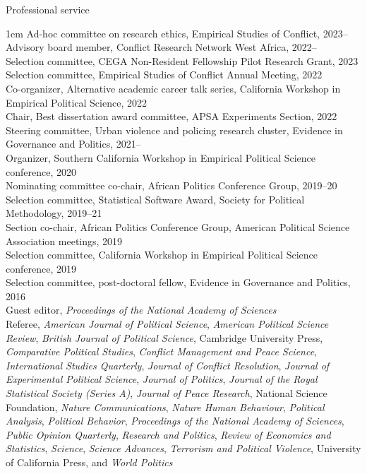\documentclass[10.9pt]{article}
\makeatletter
\newcommand\donotbreakhere{\par\nobreak\@afterheading\vspace{1em}}
\newenvironment{indnt}{\begin{adjustwidth}{1em}{}}{\end{adjustwidth}}
\makeatother
\begin{document}
{\large Professional service} \donotbreakhere
\begin{indnt}
Ad-hoc committee on research ethics, Empirical Studies of Conflict, 2023--\\[0.75em]
Advisory board member, Conflict Research Network West Africa, 2022--\\[0.75em]
Selection committee, CEGA Non-Resident Fellowship Pilot Research Grant, 2023\\[0.75em]
Selection committee, Empirical Studies of Conflict Annual Meeting, 2022\\[0.75em]
Co-organizer, Alternative academic career talk series, California Workshop in Empirical Political Science, 2022\\[0.75em]
Chair, Best dissertation award committee, APSA Experiments Section, 2022\\[0.75em]
Steering committee, Urban violence and policing research cluster, Evidence in Governance and Politics, 2021--\\[.75em]
Organizer, Southern California Workshop in Empirical Political Science conference, 2020 \\[.75em]
Nominating committee co-chair, African Politics Conference Group, 2019--20 \\[.75em]
Selection committee, Statistical Software Award, Society for Political Methodology, 2019--21 \\[.75em]
Section co-chair, African Politics Conference Group, American Political Science Association meetings, 2019 \\[.75em]
Selection committee, California Workshop in Empirical Political Science conference, 2019 \\[.75em]
Selection committee, post-doctoral fellow, Evidence in Governance and Politics, 2016 \\[.75em]
Guest editor, {\it Proceedings of the National Academy of Sciences}\\[.75em]
Referee, {\it American Journal of Political Science}, {\it American Political Science Review}, {\it British Journal of Political Science}, Cambridge University Press, {\it Comparative Political Studies}, {\it Conflict Management and Peace Science},  {\it International Studies Quarterly}, {\it Journal of Conflict Resolution}, {\it Journal of Experimental Political Science}, {\it Journal of Politics}, {\it Journal of the Royal Statistical Society (Series A)}, {\it Journal of Peace Research}, National Science Foundation, {\it Nature Communications}, {\it Nature Human Behaviour}, {\it Political Analysis}, {\it Political Behavior}, {\it Proceedings of the National Academy of Sciences}, {\it Public Opinion Quarterly}, {\it Research and Politics}, {\it Review of Economics and Statistics}, {\it Science}, {\it Science Advances}, {\it Terrorism and Political Violence}, University of California Press, and {\it World Politics} 
\end{indnt}
\vspace{1.5em}
\end{document}
